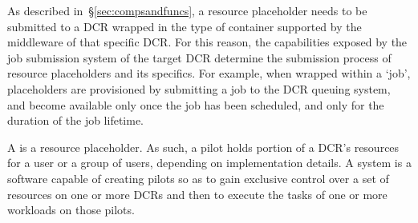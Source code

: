 \documentclass{sig-alternate}
\begin{document}


As described in~\S\ref{sec:compsandfuncs}, a resource placeholder needs to be
submitted to a DCR wrapped in the type of container supported by the middleware
of that specific DCR. For this reason, the capabilities exposed by the job
submission system of the target DCR determine the submission process of resource
placeholders and its specifics. For example, when wrapped within a `job',
placeholders are provisioned by submitting a job to the DCR queuing system, and
become available only once the job has been scheduled, and only for the duration
of the job lifetime.



A \pilot is a resource placeholder. As such, a pilot holds portion of a DCR's
resources for a user or a group of users, depending on implementation details. A
\pilotjob system is a software capable of creating pilots so as to gain
exclusive control over a set of resources on one or more DCRs and then to
execute the tasks of one or more workloads on those pilots.
\end{document}
